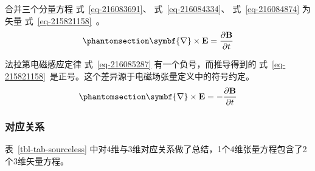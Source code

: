 \documentclass[
  chinese,
  a4paper,
  UTF8,
  12pt,
  oneside,
  openany]{ctexbook}
\begin{document}
合并三个分量方程 式~\ref{eq-216083691}、 式~\ref{eq-216084334}、
式~\ref{eq-216084874} 为矢量 式~\ref{eq-215821158}~。
\begin{equation}\protect\phantomsection\label{eq-215821158}{\symbf{\nabla} \times \mathbf{E} = \frac{\partial\mathbf{B}}{\partial t}}\end{equation}

法拉第电磁感应定律 式~\ref{eq-216085287}
有一个负号\hspace{0pt}，而推导得到的
式~\ref{eq-215821158}~是正号。这个差异源于电磁场张量定义中的符号约定。
\begin{equation}\protect\phantomsection\label{eq-216085287}{\symbf{\nabla} \times \mathbf{E} = - \frac{\partial\mathbf{B}}{\partial t}}\end{equation}

\subsubsection{对应关系}\label{ux5bf9ux5e94ux5173ux7cfb-1}

表~\ref{tbl-tab-sourceless}
中对4维与3维对应关系做了总结，1个4维张量方程包含了2个3维矢量方程。
\end{document}
